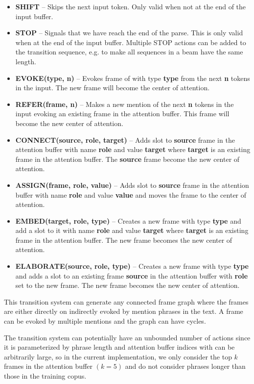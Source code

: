 \documentclass[11pt,a4paper]{article}
\begin{document}
\begin{itemize}
  \item {\bf SHIFT} -- Skips the next input token. Only valid when not at the
        end of the input buffer.
  \item {\bf STOP} -- Signals that we have reach the end of the parse. This is
        only valid when at the end of the input buffer. Multiple STOP actions
        can be added to the transition sequence, e.g. to make all sequences in a
        beam have the same length.
  \item {\bf EVOKE(type, n)} -- Evokes frame of with type {\bf type} from
        the next {\bf n} tokens in the input. The new frame will become the
        center of attention.
  \item {\bf REFER(frame, n)} -- Makes a new mention of the next {\bf n} tokens
        in the input evoking an existing frame in the attention buffer. This
        frame will become the new center of attention.
  \item {\bf CONNECT(source, role, target)} -- Adds slot to {\bf source} frame
        in the attention buffer with name {\bf role} and value {\bf target}
        where {\bf target} is an existing frame in the attention buffer. The
        {\bf source} frame become the new center of attention.
  \item {\bf ASSIGN(frame, role, value)} -- Adds slot to {\bf source} frame in
        the attention buffer  with name {\bf role} and value {\bf value} and
        moves the frame to the center of attention.
  \item {\bf EMBED(target, role, type)} -- Creates a new frame with
        type {\bf type} and add a slot to it with name {\bf role} and value
        {\bf target} where {\bf target} is an existing frame in the attention
        buffer. The new frame becomes the new center of attention.
  \item {\bf ELABORATE(source, role, type)} -- Creates a new frame with type
        {\bf type} and adds a slot to an existing frame {\bf source} in the
        attention buffer with {\bf role} set to the new frame. The new frame
        becomes the new center of attention.
\end{itemize}

This transition system can generate any connected frame graph where the frames
are either directly on indirectly evoked by mention phrases in the text. A frame
can be evoked by multiple mentions and the graph can have cycles.

The transition system can potentially have an unbounded number of actions since
it is parameterized by phrase length and attention buffer indices with can be
arbitrarily large, so in the current implementation, we only consider the
top $k$ frames in the attention buffer $(k=5)$ and do not consider phrases
longer than those in the training copus.
\end{document}
